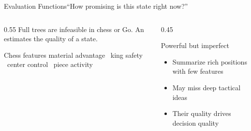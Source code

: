 \documentclass[aspectratio=169,11pt]{beamer}
\begin{document}
\begin{frame}{Evaluation Functions}{``How promising is this state right now?''}
  \begin{columns}[T]
    \begin{column}{0.55\textwidth}
      Full trees are infeasible in chess or Go. An 
      estimates the quality of a  state.
      \vspace{0.3em}
      \begin{block}{Chess features}
        \small material advantage \textbullet\ king safety \textbullet\ center
        control \textbullet\ piece activity
      \end{block}
    \end{column}
    \begin{column}{0.45\textwidth}
      \begin{alertblock}{Powerful but imperfect}
        \small
        \begin{itemize}
          \item Summarize rich positions with few features
          \item May miss deep tactical ideas
          \item Their quality drives decision quality
        \end{itemize}
      \end{alertblock}
    \end{column}
  \end{columns}
\end{frame}
\end{document}
